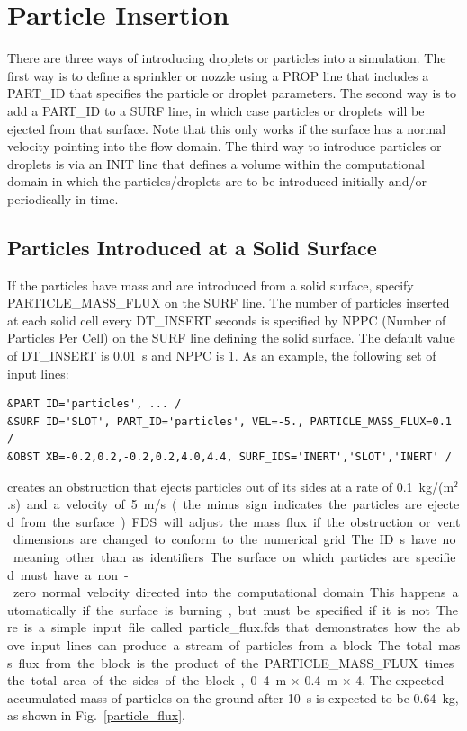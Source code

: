 \documentclass[11pt]{book}
\begin{document}
\section{Particle Insertion}
\label{info:controlling_droplets}

There are three ways of introducing droplets or particles into a simulation. The first way is to define a sprinkler or
nozzle using a {\ct PROP} line that includes a {\ct PART\_ID} that specifies the particle or droplet parameters. The second way is to
add a {\ct PART\_ID} to a {\ct SURF} line, in which case particles or droplets will be ejected from that surface. Note that
this only works if the surface has a normal velocity pointing into the flow domain. The third way to introduce particles or
droplets is via an {\ct INIT} line that defines a volume within the computational domain in which the particles/droplets are
to be introduced initially and/or periodically in time.


\subsection{Particles Introduced at a Solid Surface}
\label{info:particle_flux}

If the particles have mass and are introduced from a solid surface, specify {\ct PARTICLE\_MASS\_FLUX} on the {\ct SURF} line. The number of particles inserted at each solid cell every
{\ct DT\_INSERT} seconds is specified by {\ct NPPC} (Number of Particles Per Cell) on the {\ct SURF} line defining the solid surface. The default value of {\ct DT\_INSERT} is 0.01~s and {\ct NPPC} is 1. As an example, the following set of input lines:
\begin{lstlisting}
&PART ID='particles', ... /
&SURF ID='SLOT', PART_ID='particles', VEL=-5., PARTICLE_MASS_FLUX=0.1 /
&OBST XB=-0.2,0.2,-0.2,0.2,4.0,4.4, SURF_IDS='INERT','SLOT','INERT' /
\end{lstlisting}
creates an obstruction that ejects particles out of its sides at a rate
of 0.1~\si{kg/(m$^2$.s)} and a velocity of 5~m/s (the minus sign indicates the particles are ejected from the surface).
FDS will adjust the mass flux if the obstruction or vent dimensions are changed to conform to the numerical grid. The
{\ct ID}s have no meaning other than as identifiers. The surface on which particles are specified must have a non-zero normal velocity directed into the
computational domain. This happens automatically if the surface is burning, but must be specified
if it is not. There is a simple input file called {\ct particle\_flux.fds} that demonstrates how the above input lines can produce a stream of
particles from a block. The total mass flux from the block is the product of the {\ct PARTICLE\_MASS\_FLUX} times the total area of the sides of the block,
0.4~m $\times$ 0.4~m $\times$ 4. The expected accumulated mass of particles on the ground after 10~s is expected to be 0.64~kg, as shown in Fig.~\ref{particle_flux}.
\end{document}
